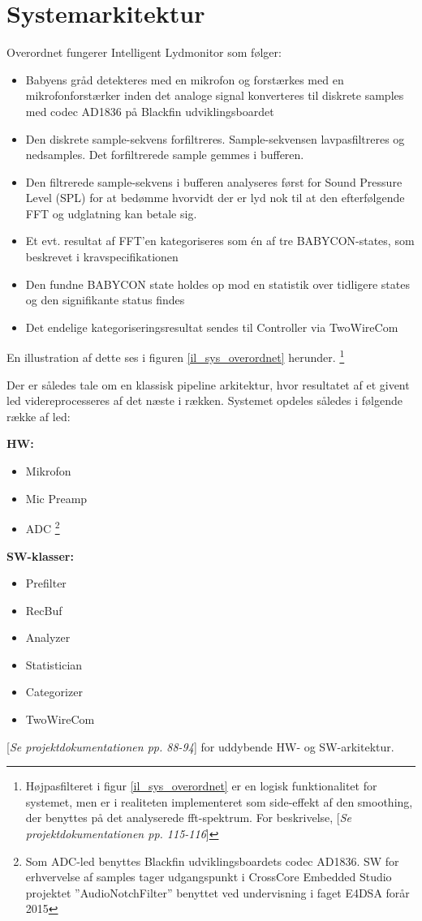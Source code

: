\section{Systemarkitektur}

Overordnet fungerer Intelligent Lydmonitor som følger:
\begin{itemize}
	\item Babyens gråd detekteres med en mikrofon og forstærkes med en mikrofonforstærker inden det analoge signal konverteres til diskrete samples med codec AD1836 på Blackfin udviklingsboardet
	\item Den diskrete sample-sekvens forfiltreres. Sample-sekvensen lavpasfiltreres og nedsamples. Det forfiltrerede sample gemmes i bufferen.
	\item Den filtrerede sample-sekvens i bufferen analyseres først for Sound Pressure Level (SPL) for at bedømme hvorvidt der er lyd nok til at den efterfølgende FFT og udglatning kan betale sig. 
	\item Et evt. resultat af FFT'en kategoriseres som én af tre BABYCON-states, som beskrevet i kravspecifikationen 
	\item Den fundne BABYCON state holdes op mod en statistik over tidligere states og den signifikante status findes
	\item Det endelige kategoriseringsresultat sendes til Controller via TwoWireCom
\end{itemize}
En illustration af dette ses i figuren \ref{il_sys_overordnet} herunder. \footnote{Højpasfilteret i figur \ref{il_sys_overordnet} er en logisk funktionalitet for systemet, men er i realiteten implementeret som side-effekt af den smoothing, der benyttes på det analyserede fft-spektrum. For beskrivelse, [\textit{Se projektdokumentationen pp. 115-116}]}


Der er således tale om en klassisk pipeline arkitektur, hvor resultatet af et givent led videreprocesseres af det næste i rækken.
Systemet opdeles således i følgende række af led:

\textbf{HW:} 
\begin{itemize}
\item Mikrofon
\item Mic Preamp
\item ADC \footnote{Som ADC-led benyttes Blackfin udviklingsboardets codec AD1836. SW for erhvervelse af samples tager udgangspunkt i CrossCore Embedded Studio projektet ''AudioNotchFilter'' benyttet ved undervisning i faget E4DSA forår 2015}
\end{itemize}

\textbf{SW-klasser:} 
\begin{itemize}
\item Prefilter
\item RecBuf
\item Analyzer
\item Statistician
\item Categorizer
\item TwoWireCom
\end{itemize}
[\textit{Se projektdokumentationen pp. 88-94}] for uddybende HW- og SW-arkitektur.
